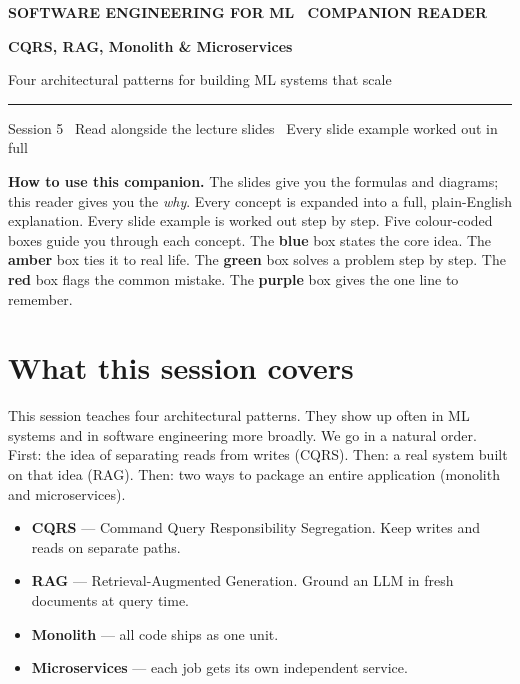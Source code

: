 \documentclass[a4paper,11pt]{article}
\providecommand{\addfontfeatureslike}[1]{#1}
\newcommand{\titlebanner}[4]{%
  \begin{tcolorbox}[
    enhanced, breakable=false,
    colback=navy, colframe=navy,
    boxrule=0pt, arc=3pt, outer arc=3pt,
    left=16pt, right=16pt, top=16pt, bottom=16pt,
    before skip=2pt, after skip=14pt,
    width=\linewidth ]
    {\sffamily\footnotesize\bfseries\color{white!85}%
      \MakeUppercase{\addfontfeatureslike{#1}}}\par
    \vspace{6pt}
    {\sffamily\bfseries\fontsize{28}{32}\selectfont\color{white} #2\par}
    \vspace{5pt}
    {\sffamily\large\color{white!88} #3\par}
    \vspace{9pt}
    {\color{white!55}\rule{\linewidth}{0.4pt}}\par
    \vspace{6pt}
    {\sffamily\footnotesize\color{white!82} #4\par}
  \end{tcolorbox}%
}
\begin{document}

\thispagestyle{fancy}

\titlebanner
  {Software Engineering for ML \textperiodcentered\ Companion Reader}
  {CQRS, RAG, Monolith \& Microservices}
  {Four architectural patterns for building ML systems that scale}
  {Session 5 \textperiodcentered\ Read alongside the lecture slides \textperiodcentered\ Every slide example worked out in full}

\noindent\textbf{How to use this companion.}
The slides give you the formulas and diagrams; this reader gives you the \emph{why}.
Every concept is expanded into a full, plain-English explanation.
Every slide example is worked out step by step.
Five colour-coded boxes guide you through each concept.
The \textcolor{intuFrame}{\textbf{blue}} box states the core idea.
The \textcolor{everyFrame}{\textbf{amber}} box ties it to real life.
The \textcolor{workFrame}{\textbf{green}} box solves a problem step by step.
The \textcolor{watchFrame}{\textbf{red}} box flags the common mistake.
The \textcolor{keyFrame}{\textbf{purple}} box gives the one line to remember.

\medskip

\section{What this session covers}

This session teaches four architectural patterns.
They show up often in ML systems and in software engineering more broadly.
We go in a natural order.
First: the idea of separating reads from writes (CQRS).
Then: a real system built on that idea (RAG).
Then: two ways to package an entire application (monolith and microservices).

\begin{itemize}
  \item \textbf{CQRS} --- Command Query Responsibility Segregation.
    Keep writes and reads on separate paths.
  \item \textbf{RAG} --- Retrieval-Augmented Generation.
    Ground an LLM in fresh documents at query time.
  \item \textbf{Monolith} --- all code ships as one unit.
  \item \textbf{Microservices} --- each job gets its own independent service.
\end{itemize}
\end{document}
